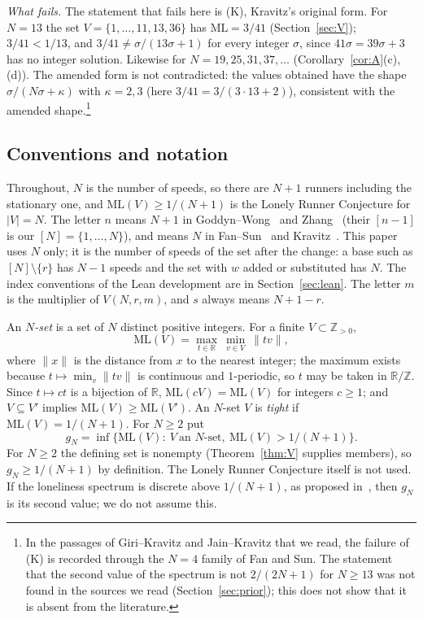 \documentclass[11pt]{article}
\theoremstyle{definition}
\theoremstyle{remark}
\newcommand{\nd}[1]{\lVert #1\rVert}
\newcommand{\ML}{\mathrm{ML}}
\newcommand{\ZZ}{\mathbb{Z}}
\newcommand{\RR}{\mathbb{R}}
\begin{document}
\emph{What fails.} The statement that fails here is (K), Kravitz's original form. For $N=13$ the set $V=\{1,\dots,11,13,36\}$ has $\ML=3/41$ (Section~\ref{sec:V}); $3/41<1/13$, and $3/41\ne\sigma/(13\sigma+1)$ for every integer $\sigma$, since $41\sigma=39\sigma+3$ has no integer solution. Likewise for $N=19,25,31,37,\dots$ (Corollary~\ref{cor:A}(c),(d)). The amended form is not contradicted: the values obtained have the shape $\sigma/(N\sigma+\kappa)$ with $\kappa=2,3$ (here $3/41=3/(3\cdot13+2)$), consistent with the amended shape.\footnote{In the passages of Giri--Kravitz and Jain--Kravitz that we read, the failure of (K) is recorded through the $N=4$ family of Fan and Sun. The statement that the second value of the spectrum is not $2/(2N+1)$ for $N\ge13$ was not found in the sources we read (Section~\ref{sec:prior}); this does not show that it is absent from the literature.}

\subsection{Conventions and notation}\label{sec:conv}
Throughout, $N$ is the number of speeds, so there are $N+1$ runners including the stationary one, and $\ML(V)\ge1/(N+1)$ is the Lonely Runner Conjecture for $|V|=N$. The letter $n$ means $N+1$ in Goddyn--Wong~\cite{GW} and Zhang~\cite{Z} (their $[n-1]$ is our $[N]=\{1,\dots,N\}$), and means $N$ in Fan--Sun~\cite{FS} and Kravitz~\cite{K}. This paper uses $N$ only; it is the number of speeds of the set after the change: a base such as $[N]\setminus\{r\}$ has $N-1$ speeds and the set with $w$ added or substituted has $N$. The index conventions of the Lean development are in Section~\ref{sec:lean}. The letter $m$ is the multiplier of $V(N,r,m)$, and $s$ always means $N+1-r$.

An \emph{$N$-set} is a set of $N$ distinct positive integers. For a finite $V\subset\ZZ_{>0}$,
\[
\ML(V)=\max_{t\in\RR}\ \min_{v\in V}\ \nd{tv},
\]
where $\nd{x}$ is the distance from $x$ to the nearest integer; the maximum exists because $t\mapsto\min_v\nd{tv}$ is continuous and $1$-periodic, so $t$ may be taken in $\RR/\ZZ$. Since $t\mapsto ct$ is a bijection of $\RR$, $\ML(cV)=\ML(V)$ for integers $c\ge1$; and $V\subseteq V'$ implies $\ML(V)\ge\ML(V')$. An $N$-set $V$ is \emph{tight} if $\ML(V)=1/(N+1)$. For $N\ge2$ put
\[
g_N=\inf\{\ML(V):\ V\ \text{an $N$-set},\ \ML(V)>1/(N+1)\}.
\]
For $N\ge2$ the defining set is nonempty (Theorem~\ref{thm:V} supplies members), so $g_N\ge1/(N+1)$ by definition. The Lonely Runner Conjecture itself is not used. If the loneliness spectrum is discrete above $1/(N+1)$, as proposed in~\cite{K,FS}, then $g_N$ is its second value; we do not assume this.
\end{document}
